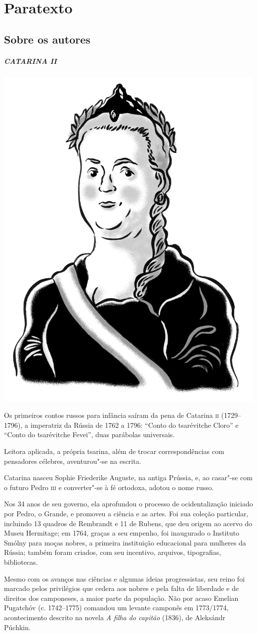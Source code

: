 \chapter{Paratexto}\label{paratexto}
\begingroup\scriptsize


\section{Sobre os autores}

\paragraph{CATARINA II }
\noindent\includegraphics[width=.8in]{./imgs/autor1.jpg}

\noindent{}Os primeiros contos russos para infância saíram da pena de Catarina \textsc{ii}
(1729--1796), a imperatriz da Rússia de 1762 a 1796: ``Conto do
tsarévitche Cloro'' e ``Conto do tsarévitche Fevei'', duas parábolas universais.

Leitora aplicada, a própria tsarina, além de trocar correspondências com
pensadores célebres, aventurou"-se na escrita.

Catarina nasceu Sophie Friederike Auguste, na antiga Prússia, e, ao
casar"-se com o futuro Pedro \textsc{iii} e converter"-se à fé ortodoxa, adotou o nome
russo.

Nos 34 anos de seu governo, ela aprofundou o processo de ocidentalização
iniciado por Pedro, o Grande, e promoveu a ciência e as artes. Foi sua
coleção particular, incluindo 13 quadros de Rembrandt e 11 de Rubens,
que deu origem ao acervo do Museu Hermitage; em 1764, graças a seu
empenho, foi inaugurado o Instituto Smólny para moças nobres, a primeira
instituição educacional para mulheres da Rússia; também foram criados,
com seu incentivo, arquivos, tipografias, bibliotecas.

Mesmo com os avanços nas ciências e algumas ideias progressistas, seu
reino foi marcado pelos privilégios que cedera aos nobres e pela falta
de liberdade e de direitos dos camponeses, a maior parte da população.
Não por acaso Emelian Pugatchóv (c. 1742--1775) comandou um levante
camponês em 1773/1774, acontecimento descrito na novela \emph{A filha do
capitão} (1836), de Aleksándr Púchkin.


